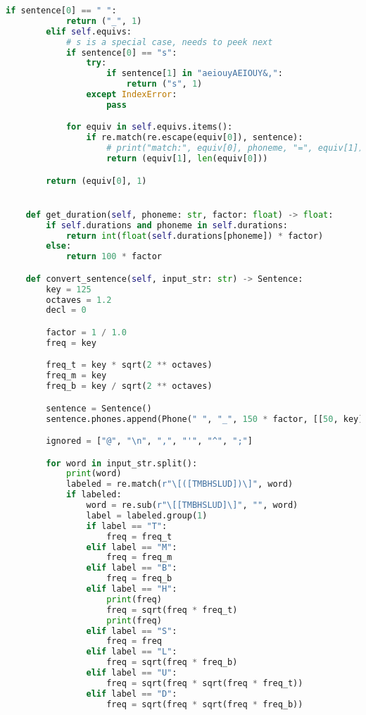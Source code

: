 \begin{lstlisting}[caption=Conversor eSpeakNG-MBROLA, label=conversao, language=Python]
        if sentence[0] == " ":
            return ("_", 1)
        elif self.equivs:
            # s is a special case, needs to peek next
            if sentence[0] == "s":
                try:
                    if sentence[1] in "aeiouyAEIOUY&,":
                        return ("s", 1)
                except IndexError:
                    pass

            for equiv in self.equivs.items():
                if re.match(re.escape(equiv[0]), sentence):
                    # print("match:", equiv[0], phoneme, "=", equiv[1])
                    return (equiv[1], len(equiv[0]))

        return (equiv[0], 1)


    def get_duration(self, phoneme: str, factor: float) -> float:
        if self.durations and phoneme in self.durations:
            return int(float(self.durations[phoneme]) * factor)
        else:
            return 100 * factor

    def convert_sentence(self, input_str: str) -> Sentence:
        key = 125
        octaves = 1.2
        decl = 0

        factor = 1 / 1.0
        freq = key

        freq_t = key * sqrt(2 ** octaves)
        freq_m = key
        freq_b = key / sqrt(2 ** octaves)

        sentence = Sentence()
        sentence.phones.append(Phone(" ", "_", 150 * factor, [[50, key]]))

        ignored = ["@", "\n", ",", "'", "^", ";"]

        for word in input_str.split():
            print(word)
            labeled = re.match(r"\[([TMBHSLUD])\]", word)
            if labeled:
                word = re.sub(r"\[[TMBHSLUD]\]", "", word)
                label = labeled.group(1)
                if label == "T":
                    freq = freq_t
                elif label == "M":
                    freq = freq_m
                elif label == "B":
                    freq = freq_b
                elif label == "H":
                    print(freq)
                    freq = sqrt(freq * freq_t)
                    print(freq)
                elif label == "S":
                    freq = freq
                elif label == "L":
                    freq = sqrt(freq * freq_b)
                elif label == "U":
                    freq = sqrt(freq * sqrt(freq * freq_t))
                elif label == "D":
                    freq = sqrt(freq * sqrt(freq * freq_b))


\end{lstlisting}
